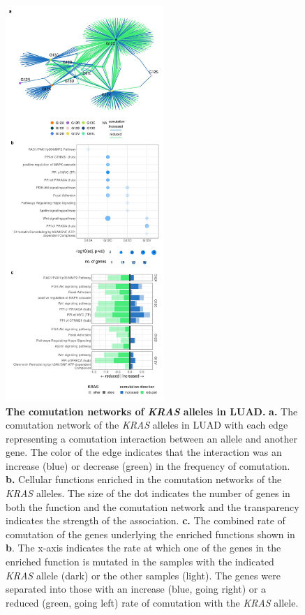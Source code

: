 \documentclass[english, 12pt, letterpaper]{article}
\newcommand{\KRAS}{\emph{KRAS}}
\begin{document}
\begin{figure}
\centering
\includegraphics[height=150mm]{figures/Figure_03.jpeg}
\caption{
    \textbf{The comutation networks of \KRAS{} alleles in LUAD.}
    \textbf{a.} The comutation network of the \KRAS{} alleles in LUAD with each edge representing a comutation interaction between an allele and another gene. The color of the edge indicates that the interaction was an increase (blue) or decrease (green) in the frequency of comutation.
    \textbf{b.} Cellular functions enriched in the comutation networks of the \KRAS{} alleles. The size of the dot indicates the number of genes in both the function and the comutation network and the transparency indicates the strength of the association.
    \textbf{c.} The combined rate of comutation of the genes underlying the enriched functions shown in \textbf{b}. The x-axis indicates the rate at which one of the genes in the enriched function is mutated in the samples with the indicated \KRAS{} allele (dark) or the other samples (light). The genes were separated into those with an increase (blue, going right) or a reduced (green, going left) rate of comutation with the \KRAS{} allele.
}
\label{fig:luad-comutation-main}
\end{figure}
\end{document}
